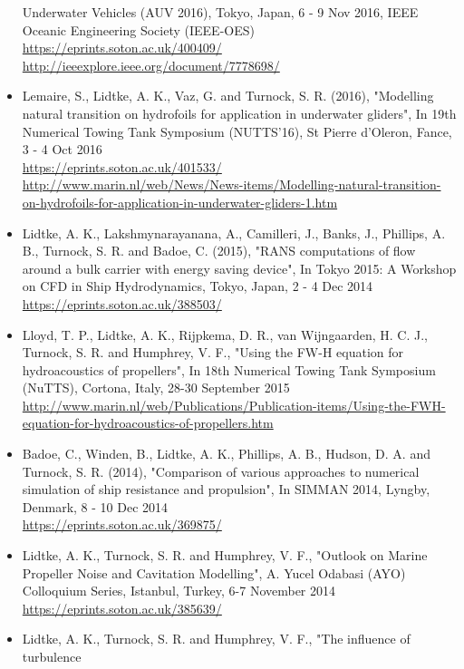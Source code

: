 \documentclass[a4paper,10pt]{article}
\begin{document}
\begin{itemize}
	Underwater Vehicles (AUV 2016), Tokyo, Japan, 6 - 9 Nov 2016, IEEE Oceanic Engineering Society (IEEE-OES)
	\cite{Lidtke2016d}
	\\ \url{https://eprints.soton.ac.uk/400409/}
	\\ \url{http://ieeexplore.ieee.org/document/7778698/}
%
\item Lemaire, S., Lidtke, A. K., Vaz, G. and Turnock, S. R. (2016), "Modelling
	natural transition on hydrofoils for application in underwater gliders",
	In 19th Numerical Towing Tank Symposium (NUTTS'16), St Pierre d'Oleron, Fance, 3 - 4 Oct 2016
	\cite{Lemaire2016}
	\\ \url{https://eprints.soton.ac.uk/401533/}
	\\ \url{http://www.marin.nl/web/News/News-items/Modelling-natural-transition-on-hydrofoils-for-application-in-underwater-gliders-1.htm}
%
\item Lidtke, A. K., Lakshmynarayanana, A., Camilleri, J., Banks, J., Phillips, A. B.,
	Turnock, S. R. and Badoe, C. (2015), "RANS computations of flow around a bulk
	carrier with energy saving device", In Tokyo 2015: A Workshop on CFD in Ship
	Hydrodynamics, Tokyo, Japan, 2 - 4 Dec 2014
	\cite{Lidtke2015b}
	\\ \url{https://eprints.soton.ac.uk/388503/}
%
\item Lloyd, T. P., Lidtke, A. K., Rijpkema, D. R., van Wijngaarden, H. C. J.,
	Turnock, S. R. and Humphrey, V. F., "Using the FW-H equation for hydroacoustics
	of propellers", In 18th Numerical Towing Tank Symposium (NuTTS), Cortona, Italy, 28-30 September 2015
	\cite{Lloyd2015a}
	\\ \url{http://www.marin.nl/web/Publications/Publication-items/Using-the-FWH-equation-for-hydroacoustics-of-propellers.htm}
%
\item Badoe, C., Winden, B., Lidtke, A. K., Phillips, A. B., Hudson, D. A. and
	Turnock, S. R. (2014), "Comparison of various approaches to numerical simulation
	of ship resistance and propulsion", In SIMMAN 2014, Lyngby, Denmark, 8 - 10 Dec 2014
	\cite{Badoe2014}
	\\ \url{https://eprints.soton.ac.uk/369875/}
%
\item Lidtke, A. K., Turnock, S. R. and Humphrey, V. F., "Outlook on Marine Propeller
	Noise and Cavitation Modelling", A. Yucel Odabasi (AYO) Colloquium Series, Istanbul,
	Turkey, 6-7 November 2014
	\cite{Lidtke2014a}
	\\ \url{https://eprints.soton.ac.uk/385639/}
%
\item Lidtke, A. K., Turnock, S. R. and Humphrey, V. F., "The influence of turbulence

\end{itemize}
\end{document}
